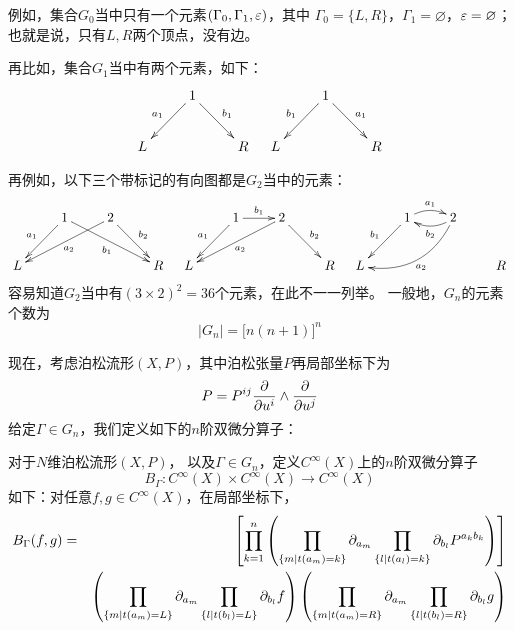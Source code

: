 例如，集合$G_0$当中只有一个元素$(\Gamma_0,\Gamma_1,\varepsilon)$，其中
$\Gamma_0=\{L,R\}$，$\Gamma_1=\varnothing$，$\varepsilon=\varnothing$；
也就是说，只有$L,R$两个顶点，没有边。

再比如，集合$G_1$当中有两个元素，如下：
$$
  \xymatrix{
    &1\ar[dl]_{a_1}  \ar[dr]^{b_1}
    &
  \\
     L
    &
    &R
  }
\quad
   \xymatrix{
    &1\ar[dl]_{b_1}  \ar[dr]^{a_1}
    &
  \\
     L
    &
    &R
  }
$$

再例如，以下三个带标记的有向图都是$G_2$当中的元素：
$$
  \xymatrix{
    &1  \ar[ld]_{a_1}  \ar[rrd]_{b_1}
    &2  \ar[lld]^{a_2}  \ar[rd]^{b_2}
    &
  \\
     L
    &
    &
    &R
  }
\quad
  \xymatrix{
    &1  \ar[ld]_{a_1}  \ar[r]^{b_1}
    &2  \ar[lld]^{a_2}  \ar[rd]^{b_2}
    &
  \\
     L
    &
    &
    &R
  }
\quad
  \xymatrix{
    &1  \ar[ld]_{b_1}  \ar@/^/[r]^{a_1}
    &2  \ar@/^/[l]^{b_2}  \ar@/^1.3pc/[lld]^{a_2}
    &
  \\
     L
    &
    &
    &R
  }
$$
容易知道$G_2$当中有$(3\times 2)^2=36$个元素，在此不一一列举。
一般地，$G_n$的元素个数为
$$|G_n|=\big[n(n+1)\big]^n$$

现在，考虑泊松流形$(X,P)$，其中泊松张量$P$再局部坐标下为
$$P=P^{ij}\frac{\partial } {\partial u^i}\wedge\frac{\partial } {\partial u^j}$$
给定$\Gamma\in G_n$，我们定义如下的$n$阶双微分算子：


\begin{definition}

对于$N$维泊松流形$(X,P)$，
以及$\Gamma\in G_n$，定义$C^{\infty}(X)$上的$n$阶双微分算子
$$B_{\Gamma}:C^{\infty}(X)\times C^{\infty}(X)\to C^{\infty}(X)$$
如下：对任意$f,g\in C^{\infty}(X)$，在局部坐标下，
\begin{eqnarray*}
    B_{\Gamma}(f,g)
&=&
    \left[
      \prod_{k=1}^n
      \left(
        \prod_{\{m|t(a_m)=k\}}
          \partial_{a_m}
        \prod_{\{l|t(a_l)=k\}}
          \partial_{b_l}
        P^{a_kb_k}
      \right)
    \right]\\
& &
      \left(
        \prod_{\{m|t(a_m)=L\}}
          \partial_{a_m}
        \prod_{\{l|t(b_l)=L\}}
          \partial_{b_l}
        f
      \right)
      \left(
        \prod_{\{m|t(a_m)=R\}}
          \partial_{a_m}
        \prod_{\{l|t(b_l)=R\}}
          \partial_{b_l}
        g
      \right)
\end{eqnarray*}
\end{definition}

